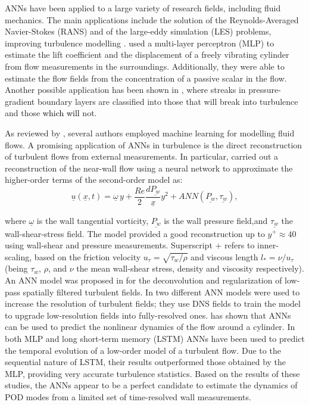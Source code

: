 ANNs have been applied to a large variety of research fields, including fluid mechanics.
The main applications include the solution of the Reynolds-Averaged Navier-Stokes (RANS) and of the large-eddy simulation (LES) problems, improving turbulence modelling \citep{ling2016reynolds,wu2017priori,maulik2019subgrid,nikolaou2019progress}.
\citet{raissi2019deep} used a multi-layer perceptron (MLP) to estimate the lift coefficient and the displacement of a freely vibrating cylinder from flow measurements in the surroundings.
Additionally, they were able to estimate the flow fields from the concentration of a passive scalar in the flow.
Another possible application has been shown in \citet{hack2016data}, where streaks in pressure-gradient boundary layers are classified into those that will break into turbulence and those \textcolor{black}{which will} not.

As reviewed by \citet{brunton2020machine}, several authors employed machine learning for modelling fluid flows.
A promising application of ANNs in turbulence is the direct reconstruction of turbulent flows from external measurements.
In particular, \citet{milano2002neural} carried out a reconstruction of the near-wall flow using a neural network to approximate the higher-order terms of the second-order model as:
\begin{equation}
   \underline{u}(\underline{x},t) = \underline{\omega}\,y+\frac{Re}{2}\frac{d\underline{P_w}}{\underline{x}}y^2 + ANN(\underline{P_w},\underline{\tau_{w}}),
   \label{eq1}
\end{equation}

\noindent where $\underline{\omega}$ is the wall tangential vorticity, $\underline{P_w}$ is the wall pressure field,and $\underline{\tau_{w}}$ the wall-shear-stress field.
The model provided a good reconstruction up to $y^+\approx 40$ using wall-shear and pressure measurements.
Superscript $+$ refers to inner-scaling, based on the friction velocity $u_{\tau}=\sqrt{\tau_w/\rho}$ and viscous length $l_*=\nu/u_{\tau}$ (being $\tau_w$, $\rho$, and $\nu$ the mean wall-shear stress, density and viscosity respectively).
An ANN model was proposed in \citet{maulik2017neural} for the deconvolution and regularization of low-pass spatially filtered turbulent fields.
In \citet{fukami2019super} two different ANN models were used to increase the resolution of turbulent fields; they use DNS fields to train the model to upgrade low-resolution fields into fully-resolved ones.
\citet{lusch2018deep} has shown that ANNs can be used to predict the nonlinear dynamics of the flow around a cylinder. In \citet{srinivasan2019predictions} both MLP and long short-term memory (LSTM) ANNs have been used to predict the temporal evolution of a low-order model of a turbulent flow.
Due to the sequential nature of LSTM, their results outperformed those obtained by the MLP, providing very accurate turbulence statistics.
Based on the results of these studies, the ANNs appear to be a perfect candidate to estimate the dynamics of POD modes from a limited set of time-resolved wall measurements.

